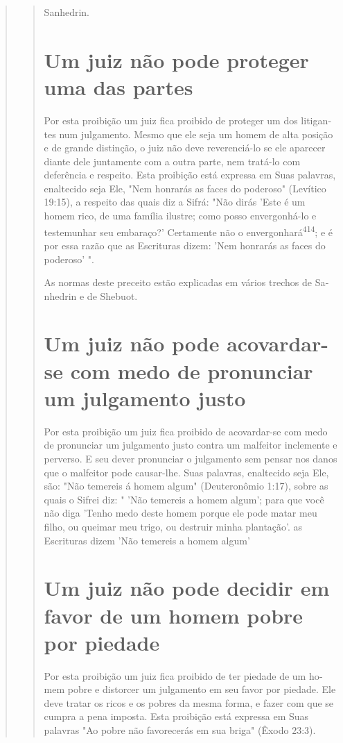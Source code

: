 \begin{quote}
\begin{quote}
Sanhedrin.

\section{Um juiz não pode proteger uma das partes}

Por esta proibição um juiz fica proibido de proteger um dos litigan­tes
num julgamento. Mesmo que ele seja um homem de alta posição e de gran­de
distinção, o juiz não deve reverenciá-lo se ele aparecer diante dele
junta­mente com a outra parte, nem tratá-lo com deferência e respeito.
Esta proibi­ção está expressa em Suas palavras, enaltecido seja Ele,
"Nem honrarás as faces do poderoso" (Levítico 19:15), a respeito das
quais diz a Sifrá: "Não dirás 'Este é um homem rico, de uma família
ilustre; como posso envergonhá-lo e teste­munhar seu embaraço?'
Certamente não o envergonhará\textsuperscript{414}; e é por essa razão
que as Escrituras dizem: 'Nem honrarás as faces do poderoso' ".

As normas deste preceito estão explicadas em vários trechos de
Sa­nhedrin e de Shebuot.

\section{Um juiz não pode acovardar-se com medo de pronunciar um julgamento justo}

Por esta proibição um juiz fica proibido de acovardar-se com medo de
pronunciar um julgamento justo contra um malfeitor inclemente e
perver­so. E seu dever pronunciar o julgamento sem pensar nos danos que
o malfeitor pode causar-lhe. Suas palavras, enaltecido seja Ele, são:
"Não temereis á homem algum" (Deuteronômio 1:17), sobre as quais o
Sifrei diz: " 'Não temereis a ho­mem algum'; para que você não diga
'Tenho medo deste homem porque ele pode matar meu filho, ou queimar meu
trigo, ou destruir minha plantação'. as Escrituras dizem 'Não temereis a
homem algum'

\section{Um juiz não pode decidir em favor de um homem pobre por piedade}

Por esta proibição um juiz fica proibido de ter piedade de um ho­mem
pobre e distorcer um julgamento em seu favor por piedade. Ele deve
tra­tar os ricos e os pobres da mesma forma, e fazer com que se cumpra a
pena imposta. Esta proibição está expressa em Suas palavras "Ao pobre
não favore­cerás em sua briga" (Êxodo 23:3).


\end{quote}
\end{quote}
